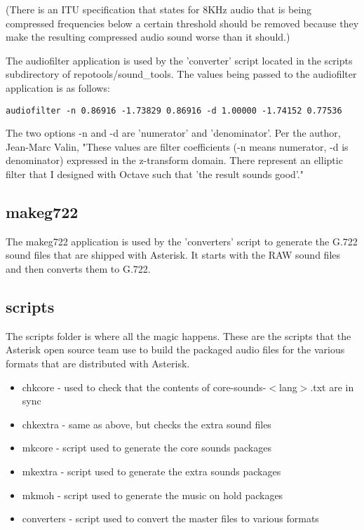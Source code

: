 (There is an ITU specification that states for 8KHz audio that is being compressed
frequencies below a certain threshold should be removed because they make the
resulting compressed audio sound worse than it should.)

The audiofilter application is used by the 'converter' script located in the
scripts subdirectory of repotools/sound_tools. The values being passed to the
audiofilter application is as follows:

\begin{astlisting}
\begin{verbatim}
audiofilter -n 0.86916 -1.73829 0.86916 -d 1.00000 -1.74152 0.77536
\end{verbatim}
\end{astlisting}


The two options -n and -d are 'numerator' and 'denominator'. Per the author,
Jean-Marc Valin, "These values are filter coefficients (-n means numerator, -d is 
denominator) expressed in the z-transform domain. There represent an elliptic filter
that I designed with Octave such that 'the result sounds good'."

\subsection{makeg722}
The makeg722 application is used by the 'converters' script to generate the G.722
sound files that are shipped with Asterisk. It starts with the RAW sound files and
then converts them to G.722.

\subsection{scripts}
The scripts folder is where all the magic happens. These are the scripts that the
Asterisk open source team use to build the packaged audio files for the various
formats that are distributed with Asterisk.

\begin{itemize}
\item chkcore - used to check that the contents of core-sounds-$<$lang$>$.txt are in sync
\item chkextra - same as above, but checks the extra sound files
\item mkcore - script used to generate the core sounds packages
\item mkextra - script used to generate the extra sounds packages
\item mkmoh - script used to generate the music on hold packages
\item converters - script used to convert the master files to various formats
\end{itemize}
